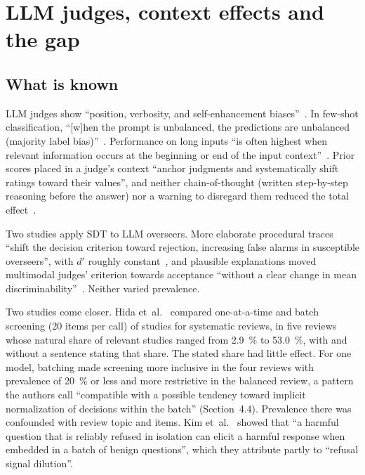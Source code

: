 \documentclass[11pt]{article}
\begin{document}
\section{LLM judges, context effects and the gap}\label{sec:judges}

\subsection{What is known}\label{sec:known}

LLM judges show ``position, verbosity, and self-enhancement biases''~\cite[Abstract]{zheng2023}. In few-shot classification, ``[w]hen the prompt is unbalanced, the predictions are unbalanced (majority label bias)''~\cite[Fig.~4 caption]{zhao2021}. Performance on long inputs ``is often highest when relevant information occurs at the beginning or end of the input context''~\cite[Abstract]{liu2024}. Prior scores placed in a judge's context ``anchor judgments and systematically shift ratings toward their values'', and neither chain-of-thought (written step-by-step reasoning before the answer) nor a warning to disregard them reduced the total effect~\cite[Abstract]{kapetanovic2026}.

Two studies apply SDT to LLM overseers. More elaborate procedural traces ``shift the decision criterion toward rejection, increasing false alarms in susceptible overseers'', with $d'$ roughly constant~\cite[Abstract]{chen2026}, and plausible explanations moved multimodal judges' criterion towards acceptance ``without a clear change in mean discriminability''~\cite[Abstract]{cai2026}. Neither varied prevalence.

Two studies come closer. Hida et~al.~\cite{hida2026} compared one-at-a-time and batch screening (20 items per call) of studies for systematic reviews, in five reviews whose natural share of relevant studies ranged from \SI{2.9}{\percent} to \SI{53.0}{\percent}, with and without a sentence stating that share. The stated share had little effect. For one model, batching made screening more inclusive in the four reviews with prevalence of \SI{20}{\percent} or less and more restrictive in the balanced review, a pattern the authors call ``compatible with a possible tendency toward implicit normalization of decisions within the batch'' (Section~4.4). Prevalence there was confounded with review topic and items. Kim et~al.~\cite[Abstract]{kim2026} showed that ``a harmful question that is reliably refused in isolation can elicit a harmful response when embedded in a batch of benign questions'', which they attribute partly to ``refusal signal dilution''.
\end{document}
